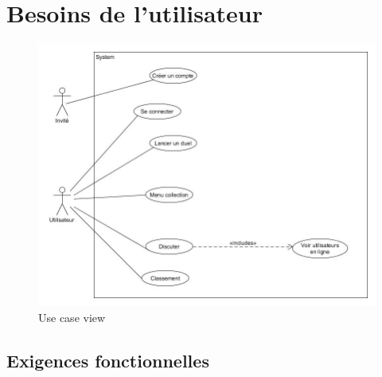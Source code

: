 \chapter{Besoins de l'utilisateur}
{
\begin{figure}[H]
    \includegraphics[width=1\textwidth,height=1\textwidth]{Images/useCase.jpg}
    \caption{\label{Use case view}Use case view}
\end{figure}
}

\section{Exigences fonctionnelles}

